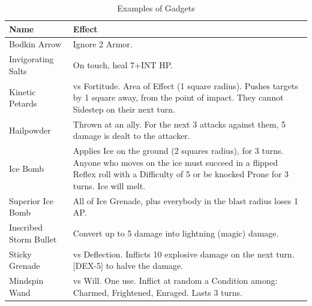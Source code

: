 \begin{table}[h!tbp]
	\begin{center}
		\begin{tabular}{p{4cm}p{12cm}} \toprule
			
		    \textbf{Name} & \textbf{Effect} \\ \midrule

		    Bodkin Arrow & Ignore 2 Armor. \\[2mm] 

            Invigorating Salts & On touch, heal 7+INT HP. \\[2mm] 

            Kinetic Petards & vs Fortitude. Area of Effect (1 square radius). Pushes targets by 1 square away, from the point of impact. They cannot Sidestep on their next turn. \\[2mm] 
          
            Hailpowder & Thrown at an ally. For the next 3 attacks against them, 5 damage is dealt to the attacker. \\[2mm] 
            
            Ice Bomb & Applies Ice on the ground (2 squares radius), for 3 turns. Anyone who moves on the ice must succeed in a flipped Reflex roll with a Difficulty of 5 or be knocked Prone for 3 turns. Ice will melt. \\[2mm] 
            Superior Ice Bomb &	All of Ice Grenade, plus everybody in the blast radius loses 1 AP. \\[2mm] 

            Inscribed Storm Bullet & Convert up to 5 damage into lightning (magic) damage. \\[2mm] 

            Sticky Grenade & vs Deflection. Inflicts 10 explosive damage on the next turn. [DEX-5] to halve the damage. \\[2mm] 

            Mindspin Wand & vs Will. One use. Inflict at random a Condition among: Charmed, Frightened, Enraged. Lasts 3 turns. \\[2mm] 

		    \bottomrule
		\end{tabular}
	\end{center}
	\caption{Examples of Gadgets}
  \label{gadgets_example_table}
\end{table}

